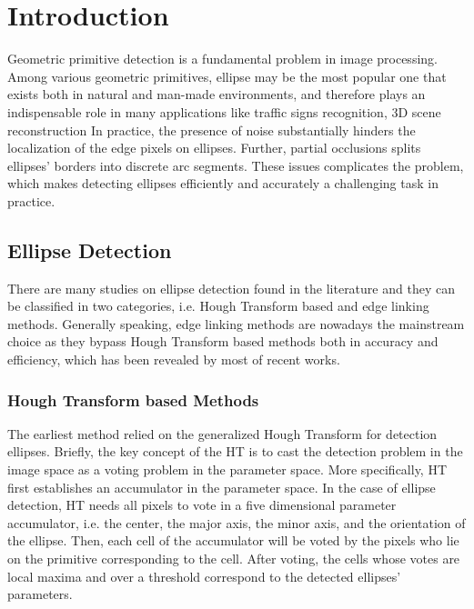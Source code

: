 \documentclass[a4paper]{report}
\begin{document}
\section{Introduction}
Geometric primitive detection is a fundamental problem in image processing. Among various geometric primitives, ellipse may be the most popular one that exists both in natural and man-made environments, and therefore plays an indispensable role in many applications like traffic signs recognition, 3D scene reconstruction
In practice, the presence of noise substantially hinders the localization of the edge pixels on ellipses. Further, partial occlusions splits ellipses' borders into discrete arc segments. These issues complicates the problem, which makes detecting ellipses efficiently and accurately a challenging task in practice. 
\subsection{Ellipse Detection}
There are many studies on ellipse detection found in the literature and they can be classified in two categories, i.e. Hough Transform based and edge linking methods. Generally speaking, edge linking methods are nowadays the mainstream choice as they bypass Hough Transform based methods both in accuracy and efficiency, which has been revealed by most of recent works.

\subsubsection{Hough Transform based Methods}
The earliest method relied on the generalized Hough Transform for detection ellipses. Briefly,
the key concept of the HT is to cast the detection problem in the image space as a voting problem in the parameter space. More specifically, HT first establishes an accumulator in the parameter space. In the case of ellipse detection, HT needs all pixels to vote in a five dimensional parameter accumulator, i.e. the center, the major axis, the minor axis, and the orientation of the ellipse. Then, each cell of the accumulator will be voted by the pixels who lie on the primitive corresponding to the cell. 
After voting, the cells whose votes are local maxima and over a threshold correspond to the detected ellipses' parameters.
\end{document}

